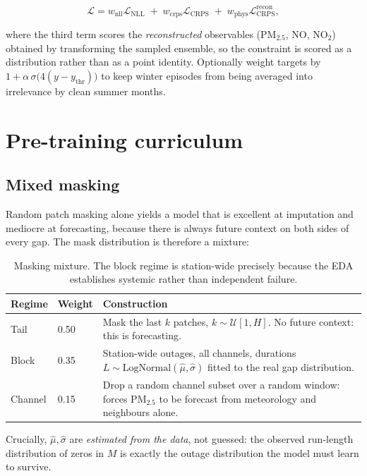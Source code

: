 \documentclass[11pt,a4paper]{article}
\begin{document}
\begin{equation}
\mathcal{L} = w_{\text{nll}}\mathcal{L}_{\text{NLL}}
\;+\; w_{\text{crps}}\mathcal{L}_{\text{CRPS}}
\;+\; w_{\text{phys}}\mathcal{L}_{\text{CRPS}}^{\text{recon}},
\end{equation}

where the third term scores the \emph{reconstructed} observables (PM$_{2.5}$, NO,
NO$_2$) obtained by transforming the sampled ensemble, so the constraint is
scored as a distribution rather than as a point identity. Optionally weight
targets by $1+\alpha\,\sigma\!\big(4(y-y_{\text{thr}})\big)$ to keep winter
episodes from being averaged into irrelevance by clean summer months.

\section{Pre-training curriculum}

\subsection{Mixed masking}

Random patch masking alone yields a model that is excellent at imputation and
mediocre at forecasting, because there is always future context on both sides of
every gap. The mask distribution is therefore a mixture:

\begin{table}[h]
\centering
\small
\begin{tabular}{@{}llp{7.4cm}@{}}
\toprule
Regime & Weight & Construction \\
\midrule
Tail    & 0.50 & Mask the last $k$ patches, $k\sim\mathcal{U}[1,H]$. No future context: this is forecasting. \\
Block   & 0.35 & Station-wide outages, all channels, durations
$L\sim\mathrm{LogNormal}(\hat\mu,\hat\sigma)$ fitted to the real gap distribution. \\
Channel & 0.15 & Drop a random channel subset over a random window: forces PM$_{2.5}$ to be forecast from meteorology and neighbours alone. \\
\bottomrule
\end{tabular}
\caption{Masking mixture. The block regime is station-wide precisely because the
EDA establishes systemic rather than independent failure.}
\end{table}

Crucially, $\hat\mu,\hat\sigma$ are \emph{estimated from the data}, not guessed:
the observed run-length distribution of zeros in $M$ is exactly the outage
distribution the model must learn to survive.
\end{document}
